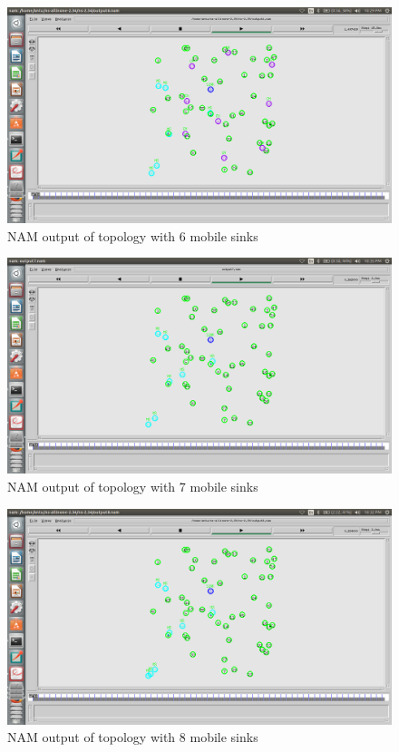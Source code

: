 \documentclass[MTech]{iitmdiss}
\begin{document}
\begin{figure}[h]
\centering
\includegraphics[scale=0.25]{6sink.PNG}
\caption{NAM output of topology with 6 mobile sinks\label{overflow}}
\label{f11}
\end{figure}
\begin{figure}[ht!]
\centering
\includegraphics[scale=0.25]{7sink.PNG}
\caption{NAM output of topology with 7 mobile sinks\label{overflow}}
\label{f12}
\end{figure}
\begin{figure}[h]
\centering
\includegraphics[scale=0.25]{8sink.PNG}
\caption{NAM output of topology with 8 mobile sinks\label{overflow}}
\label{f13}
\end{figure}
\end{document}
